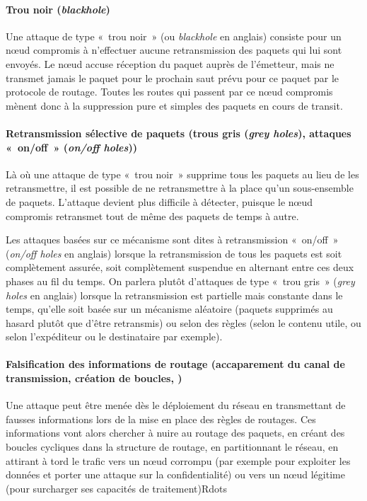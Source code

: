         \paragraph{Trou noir (\textit{blackhole})}
Une attaque de type « trou noir » (ou \textit{blackhole} en anglais) consiste pour un nœud compromis à n'effectuer aucune retransmission des paquets qui lui sont envoyés.
Le nœud accuse réception du paquet auprès de l'émetteur, mais ne transmet jamais le paquet pour le prochain saut prévu pour ce paquet par le protocole de routage.
Toutes les routes qui passent par ce nœud compromis mènent donc à la suppression pure et simples des paquets en cours de transit.

        \paragraph{Retransmission sélective de paquets (trous gris (\textit{grey holes}), attaques « on/off » (\textit{on/off holes}))}
Là où une attaque de type « trou noir » supprime tous les paquets au lieu de les retransmettre, il est possible de ne retransmettre à la place qu'un sous-ensemble de paquets.
L'attaque devient plus difficile à détecter, puisque le nœud compromis retransmet tout de même des paquets de temps à autre.

Les attaques basées sur ce mécanisme sont dites à retransmission « on/off » (\textit{on/off holes} en anglais) lorsque la retransmission de tous les paquets est soit complètement assurée, soit complètement suspendue en alternant entre ces deux phases au fil du temps.
On parlera plutôt d'attaques de type « trou gris » (\textit{grey holes} en anglais) lorsque la retransmission est partielle mais constante dans le temps, qu'elle soit basée sur un mécanisme aléatoire (paquets supprimés au hasard plutôt que d'être retransmis) ou selon des règles (selon le contenu utile, ou selon l'expéditeur ou le destinataire par exemple).

        \paragraph{Falsification des informations de routage (accaparement du canal de transmission, création de boucles, \etc)}
Une attaque peut être menée dès le déploiement du réseau en transmettant de fausses informations lors de la mise en place des règles de routages.
Ces informations vont alors chercher à nuire au routage des paquets, en créant des boucles cycliques dans la structure de routage, en partitionnant le réseau, en attirant à tord le trafic vers un nœud corrompu (par exemple pour exploiter les données et porter une attaque sur la confidentialité) ou vers un nœud légitime (pour surcharger ses capacités de traitement)Rdots


